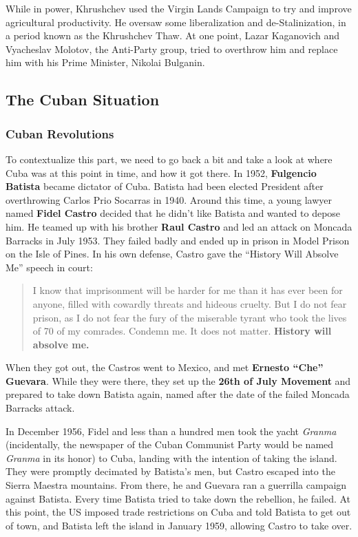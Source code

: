 While in power, Khrushchev used the Virgin Lands Campaign to try and improve agricultural productivity.
He oversaw some liberalization and de-Stalinization, in a period known as the Khrushchev Thaw.
At one point, Lazar Kaganovich and Vyacheslav Molotov, the Anti-Party group, tried to overthrow him
and replace him with his Prime Minister, Nikolai Bulganin.

\subsection*{The Cuban Situation}

\subsubsection*{Cuban Revolutions}

To contextualize this part,
we need to go back a bit and take a look at where Cuba was at this point in time, and how it got there.
In 1952, \textbf{Fulgencio Batista} became dictator of Cuba.
Batista had been elected President after overthrowing Carlos Prio Socarras in 1940.
Around this time,
a young lawyer named \textbf{Fidel Castro} decided that he didn't like Batista and wanted to depose him.
He teamed up with his brother \textbf{Raul Castro} and led an attack on Moncada Barracks in July 1953.
They failed badly and ended up in prison in Model Prison on the Isle of Pines.
In his own defense, Castro gave the ``History Will Absolve Me'' speech in court:
\begin{quote}
  I know that imprisonment will be harder for me than it has ever been for anyone,
  filled with cowardly threats and hideous cruelty.
  But I do not fear prison,
  as I do not fear the fury of the miserable tyrant who took the lives of 70 of my comrades.
  Condemn me.
  It does not matter.
  \textbf{History will absolve me.}
\end{quote}

When they got out, the Castros went to Mexico, and met \textbf{Ernesto ``Che'' Guevara}.
While they were there, they set up the \textbf{26th of July Movement} and prepared to take down Batista again,
named after the date of the failed Moncada Barracks attack.

In December 1956, Fidel and less than a hundred men took the yacht \textit{Granma}
(incidentally, the newspaper of the Cuban Communist Party would be named \textit{Granma} in its honor)
to Cuba, landing with the intention of taking the island.
They were promptly decimated by Batista's men, but Castro escaped into the Sierra Maestra mountains.
From there, he and Guevara ran a guerrilla campaign against Batista.
Every time Batista tried to take down the rebellion, he failed.
At this point, the US imposed trade restrictions on Cuba and told Batista to get out of town,
and Batista left the island in January 1959, allowing Castro to take over.


